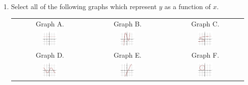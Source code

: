 \begin{enumerate}
\item  Select all of the following graphs which represent $y$ as a function of $x$.

\begin{center}
\begin{tabular}{ccc}
Graph A. & Graph B. & Graph C. \\
\includegraphics[width=0.2\textwidth]{img/chap1/sec1-2/prob3a.png} & \includegraphics[width=0.2\textwidth]{img/chap1/sec1-2/prob3b.png} &
\includegraphics[width=0.2\textwidth]{img/chap1/sec1-2/prob3c.png} \\
\midrule
Graph D. & Graph E. & Graph F. \\
\includegraphics[width=0.2\textwidth]{img/chap1/sec1-2/prob3d.png} & \includegraphics[width=0.2\textwidth]{img/chap1/sec1-2/prob3e.png} &
\includegraphics[width=0.2\textwidth]{img/chap1/sec1-2/prob3f.png} \\
\end{tabular}
\end{center}


\end{enumerate}
